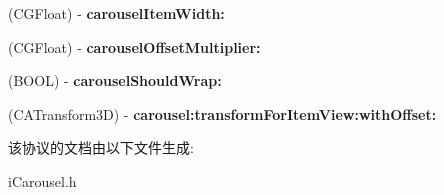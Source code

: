 \begin{DoxyCompactItemize}
\item 
\hypertarget{protocoli_carousel_delegate-p_a79d3df6f9aaaec128090055a8cf81b56}{(C\-G\-Float) -\/ {\bfseries carousel\-Item\-Width\-:}}\label{protocoli_carousel_delegate-p_a79d3df6f9aaaec128090055a8cf81b56}

\item 
\hypertarget{protocoli_carousel_delegate-p_a808fcd2a5f1f7d6c56142092fd7ff8f8}{(C\-G\-Float) -\/ {\bfseries carousel\-Offset\-Multiplier\-:}}\label{protocoli_carousel_delegate-p_a808fcd2a5f1f7d6c56142092fd7ff8f8}

\item 
\hypertarget{protocoli_carousel_delegate-p_a7dd0b45f7657fe6a77cf8a5825a3c11c}{(B\-O\-O\-L) -\/ {\bfseries carousel\-Should\-Wrap\-:}}\label{protocoli_carousel_delegate-p_a7dd0b45f7657fe6a77cf8a5825a3c11c}

\item 
\hypertarget{protocoli_carousel_delegate-p_a168ebbca3f018a91297c6eaf83d5c579}{(C\-A\-Transform3\-D) -\/ {\bfseries carousel\-:transform\-For\-Item\-View\-:with\-Offset\-:}}\label{protocoli_carousel_delegate-p_a168ebbca3f018a91297c6eaf83d5c579}

\end{DoxyCompactItemize}


该协议的文档由以下文件生成\-:\begin{DoxyCompactItemize}
\item 
i\-Carousel.\-h\end{DoxyCompactItemize}

